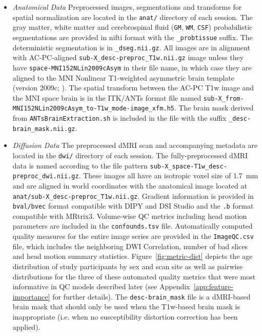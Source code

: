 \documentclass[9pt,lineno]{elife}
\begin{document}
\begin{itemize}
    \item \emph{Anatomical Data} Preprocessed images, segmentations and transforms for spatial normalization are located in the \texttt{anat/} directory of each session. The gray matter, white matter and  cerebrospinal fluid (\texttt{GM}, \texttt{WM}, \texttt{CSF}) probabilistic segmentations are provided in nifti format with the \texttt{\_probtissue} suffix. The deterministic  segmentation is in \texttt{\_dseg.nii.gz}. All images are in alignment with AC-PC-aligned  \texttt{sub-X\_desc-preproc\_T1w.nii.gz} image unless they have \texttt{space-MNI152NLin2009cAsym} in their file name, in which case they are aligned to the MNI Nonlinear T1-weighted asymmetric brain template (version 2009c; \citep{Fonov2009-ze}).  The spatial transform between the AC-PC T1w image and the MNI space brain is in the ITK/ANTs format file named \texttt{sub-X\_from-MNI152NLin2009cAsym\_to-T1w\_mode-image\_xfm.h5}. The brain mask derived from \texttt{ANTsBrainExtraction.sh} is included in the file with the suffix \texttt{\_desc-brain\_mask.nii.gz}.

    \item \emph{Diffusion Data} The preprocessed dMRI scan and accompanying metadata are located in the  \texttt{dwi/} directory of each session. The fully-preprocessed dMRI data is named according to the file pattern \texttt{sub-X\_space-T1w\_desc-preproc\_dwi.nii.gz}. These images all have an isotropic voxel size of \qty{1.7}{\mm} and are aligned in world coordinates with the anatomical image located at \texttt{anat/sub-X\_desc-preproc\_T1w.nii.gz}. Gradient information is provided in \texttt{bval/bvec} format compatible with DIPY and DSI Studio and the \texttt{.b} format compatible with MRtrix3. Volume-wise QC metrics including head motion parameters are included in the \texttt{confounds.tsv} file. Automatically computed quality measures for the entire image series are provided in the \texttt{ImageQC.csv} file, which includes the neighboring DWI Correlation, number of bad slices and head motion summary statistics. Figure~\ref{fig:metric-dist} depicts the age distribution of study participants by sex and scan site as well as pairwise distributions for the three of these automated quality metrics that were most informative in QC models described later (see Appendix~\ref{app:feature-importance} for further details). The \texttt{desc-brain\_mask} file is a dMRI-based brain mask that should only be used when the T1w-based brain mask is inappropriate (i.e. when no susceptibility distortion correction has been applied).
\end{itemize}
\end{document}
